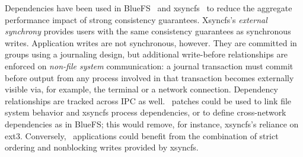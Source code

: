 Dependencies have been used in
BlueFS~\cite{nightingale05speculative} and
xsyncfs~\cite{nightingale06rethink} to reduce the aggregate performance
impact of strong consistency guarantees.
%
Xsyncfs's \emph{external synchrony} provides users with
the same consistency guarantees as synchronous writes.
%
Application writes are not synchronous, however.
%
They are committed in groups using a journaling design, but
%
additional write-before relationships are enforced on
\emph{non-file system} communication: a journal transaction must commit
before output from any process involved in that transaction becomes externally
visible via, for example, the terminal or a network connection.
%
Dependency relationships are tracked across IPC as well.
%
\Featherstitch\ patches could be used to link file system behavior
and xsyncfs process dependencies, or to define cross-network dependencies
as in BlueFS; this would remove, for instance, xsyncfs's reliance
on ext3.
%
Conversely, \Featherstitch\ applications could benefit from the
combination of strict ordering and nonblocking writes provided by xsyncfs.
%
\begin{comment}
written by that transaction, \emph{or} any
data written by processes involved in that transaction's writes after that
transaction's data that might have been computed by a process that wrote
anything in that process.
%
depending on any write in
the assuming that commit

but the system
tracks any process output that followed---and, thus, might depend
on---these writes.
%
Any user-visible operation

the b operations are combined and com a journal, but a dependency subsystem
tracks

External synchrony~\cite{nightingale06rethink} builds on journaling to
automatically provide strict file system operation ordering for applications,
without requiring them to block on each write. It combines operations into a
journal, but tracks the activity of the calling processes after returning
control to them from the file system. If a process later performs some
\emph{user-visible} operation like printing text to the screen or sending
network traffic, the journal transaction containing the changes is forced to
commit before the process can continue.
%
External synchrony depends inherently on dependency tracking; dependencies
among processes with outstanding data are tracked to ensure that
uncommitted output never reaches a user. However, it also depends on a
particular file system consistency methodology, namely journaling, and it
is implemented only in an ext3-like file system called xsyncfs. \Kudos\
\patch\ dependencies could be a natural implementation strategy for its
dependencies, allowing them to apply to any file system.
%
Similar \patch-like dependencies are used to improve network file system
performance in BlueFS~\cite{nightingale05speculative}.
\end{comment}
